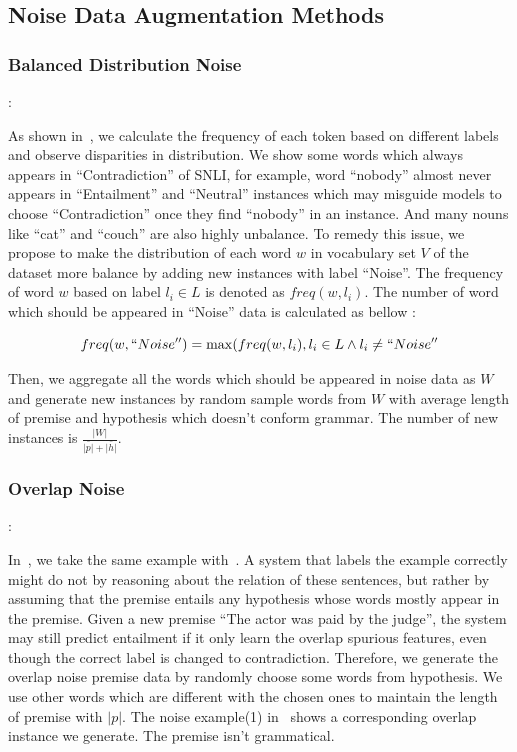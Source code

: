 \subsection{Noise Data Augmentation Methods}
\label{sec:noise_methods}

\subsubsection{Balanced Distribution Noise}:


As shown in~, we calculate the frequency of 
each token based on different labels and observe disparities in distribution. 
We show some words which always appears in ``Contradiction'' of SNLI, 
for example, word ``nobody'' almost never appears 
in ``Entailment'' and ``Neutral'' instances which may misguide models to choose 
``Contradiction'' once they find ``nobody'' in an instance. And many nouns like ``cat'' and ``couch'' 
are also highly unbalance. To remedy this issue, we propose to 
make the distribution of each word $w$ in vocabulary set $V$ of the dataset more balance by adding 
new instances with label ``Noise''. The frequency of word $w$ based on label $l_{i}\in{L}$ is denoted as $freq(w, l_{i})$. 
The number of word which should be appeared in ``Noise'' data is calculated as bellow
:

 \begin{equation}
    freq(w, ``Noise'') = \max(freq(w, l_{i}), l_{i}\in{L} \wedge l_{i}\neq{``Noise''}
\end{equation}

Then, we aggregate all the words which should be appeared in 
noise data as $W$ and generate new instances by random sample words from $W$ with 
average length of premise and hypothesis which doesn't conform grammar. 
The number of new instances is $\frac{|W|}{\bar{|p|}+\bar{|h|}}$.

\subsubsection{Overlap Noise}:

In~, we take the same example with~\cite{}.
A system that labels the example correctly
might do not by reasoning about the relation
of these sentences, but rather by assuming that the
premise entails any hypothesis whose words mostly 
appear in the premise. Given a new premise ``The actor was paid by the judge'', 
the system may still predict entailment if it only learn the overlap spurious features,
even though the correct label is changed to contradiction. Therefore, we generate 
the overlap noise premise data by randomly choose some words from hypothesis. 
We use other words which are different with the chosen ones to maintain 
the length of premise with $|p|$. The noise example(1) in~ shows 
a corresponding overlap instance we generate. The premise isn't grammatical.


